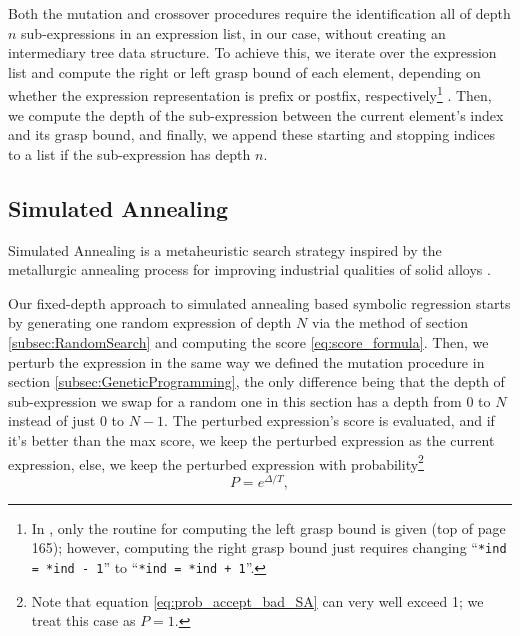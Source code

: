 \documentclass[12pt]{iopart}
\begin{document}
\par Both the mutation and crossover procedures require the identification all of depth $n$ sub-expressions in an expression list, in our case, without creating an intermediary tree data structure. To achieve this, we iterate over the expression list and compute the right or left grasp bound of each element, depending on whether the expression representation is prefix or postfix, respectively\footnote{In \cite{3ce09117-c08b-3ddb-b2ba-3ea8005b2118}, only the routine for computing the left grasp bound is given (top of page 165); however, computing the right grasp bound just requires changing ``\texttt{*ind = *ind - 1}'' to ``\texttt{*ind = *ind + 1}''.} \cite{3ce09117-c08b-3ddb-b2ba-3ea8005b2118}. Then, we compute the depth of the sub-expression between the current element's index and its grasp bound, and finally, we append these starting and stopping indices to a list if the sub-expression has depth $n$.

\subsection{Simulated Annealing} \label{subsec:SimulatedAnnealing}
Simulated Annealing is a metaheuristic search strategy inspired by the metallurgic annealing process for improving industrial qualities of solid alloys \cite{vanLaarhoven1987} \cite{10.1145/3449639.3459345}. 
\par Our fixed-depth approach to simulated annealing based symbolic regression starts by generating one random expression of depth $N$ via the method of section \ref{subsec:RandomSearch} and computing the score \ref{eq:score_formula}. Then, we perturb the expression in the same way we defined the mutation procedure in section \ref{subsec:GeneticProgramming}, the only difference being that the depth of sub-expression we swap for a random one in this section has a depth from $0$ to $N$ instead of just $0$ to $N-1$. The perturbed expression's score is evaluated, and if it's better than the max score, we keep the perturbed expression as the current expression, else, we keep the perturbed expression with probability\footnote{Note that equation \ref{eq:prob_accept_bad_SA} can very well exceed 1; we treat this case as $P=1$.} \cite{10.1145/3449639.3459345}
\begin{equation}
		P = e^{\Delta/T},  \label{eq:prob_accept_bad_SA}
\end{equation}
\end{document}
